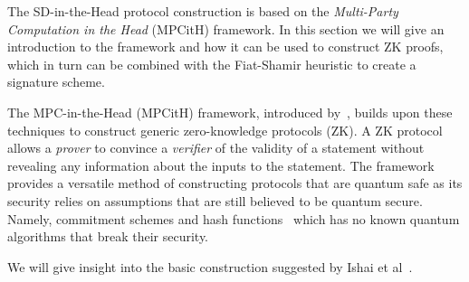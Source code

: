 \documentclass[twoside,11pt]{report}
\theoremstyle{definition}
\theoremstyle{plain}
\begin{document}
The SD-in-the-Head protocol construction is based on the \textit{Multi-Party Computation in the Head} (MPCitH) framework. In this section we will give an introduction to the framework and how it can be used to construct ZK proofs, which in turn can be combined with the Fiat-Shamir heuristic to create a signature scheme.

The MPC-in-the-Head (MPCitH) framework, introduced by~\cite{ishai2007zero}, builds upon these techniques to construct generic zero-knowledge protocols (ZK). A ZK protocol allows a \textit{prover} to convince a \textit{verifier} of the validity of a statement without revealing any information about the inputs to the statement. The framework provides a versatile method of constructing protocols that are quantum safe as its security relies on assumptions that are still believed to be quantum secure. Namely, commitment schemes and hash functions~\cite{feneuil2023threshold} which has no known quantum algorithms that break their security.

We will give insight into the basic construction suggested by Ishai et al~\cite{ishai2007zero}.
\end{document}
